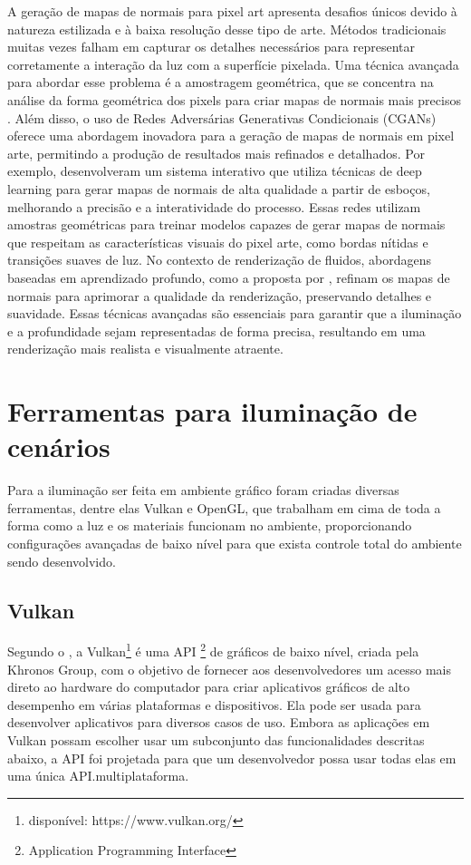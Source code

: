 A geração de mapas de normais para pixel art apresenta desafios únicos devido à natureza estilizada e à baixa resolução desse tipo de arte.
Métodos tradicionais muitas vezes falham em capturar os detalhes necessários para representar corretamente a interação da luz com a superfície pixelada.
Uma técnica avançada para abordar esse problema é a amostragem geométrica, que se concentra na análise da forma geométrica dos pixels para criar mapas de normais mais precisos \citeyear{yi_he__2021}. 
Além disso, o uso de Redes Adversárias Generativas Condicionais (CGANs) oferece uma abordagem inovadora para a geração de mapas de normais em pixel arte, permitindo a produção de resultados mais refinados e detalhados. 
Por exemplo, \citeyear{Su2018} desenvolveram um sistema interativo que utiliza técnicas de deep learning para gerar mapas de normais de alta qualidade a partir de esboços, melhorando a precisão e a interatividade do processo. 
Essas redes utilizam amostras geométricas para treinar modelos capazes de gerar mapas de normais que respeitam as características visuais do pixel arte, como bordas nítidas e transições suaves de luz. No contexto de renderização de fluidos, abordagens baseadas em aprendizado profundo, como a proposta por \citeyear{myungjin_choi__2021}, refinam os mapas de normais para aprimorar a qualidade da renderização, preservando detalhes e suavidade. 
Essas técnicas avançadas são essenciais para garantir que a iluminação e a profundidade sejam representadas de forma precisa, resultando em uma renderização mais realista e visualmente atraente.

\section{Ferramentas para iluminação de cenários}

Para a iluminação ser feita em ambiente gráfico foram criadas diversas ferramentas, dentre elas Vulkan e OpenGL, que trabalham em cima de toda a forma como a luz e os materiais funcionam no ambiente, proporcionando configurações avançadas de baixo nível para que exista controle total do ambiente sendo desenvolvido.

\subsection{Vulkan}

Segundo o \cite{Khronos_Group2016-ir}, a Vulkan\footnote{disponível: https://www.vulkan.org/} é uma API \footnote{ Application Programming Interface } de gráficos de baixo nível, criada pela Khronos Group, com o objetivo de fornecer aos desenvolvedores um acesso mais direto ao hardware do computador para criar aplicativos gráficos de alto desempenho em várias plataformas e dispositivos. Ela pode ser usada para desenvolver aplicativos para diversos casos de uso. Embora as aplicações em Vulkan possam escolher usar um subconjunto das funcionalidades descritas abaixo, a API foi projetada para que um desenvolvedor possa usar todas elas em uma única API.multiplataforma.

